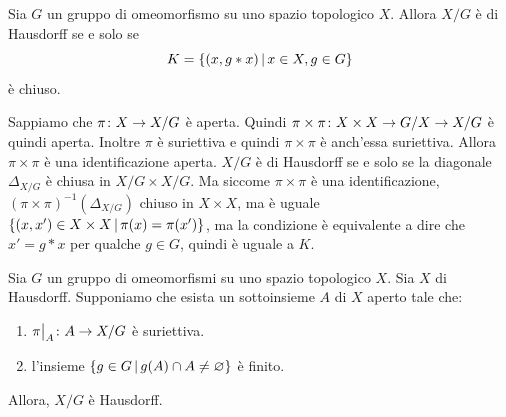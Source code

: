 \documentclass[a4paper]{article}
\begin{document}
\begin{snippetproposition}{}
    Sia \(G\) un gruppo di omeomorfismo su uno spazio topologico \(X\).
    Allora \(X/G\) è di Hausdorff se e solo se
    \[
        K = \{(x, g\ast x) \,|\, x\in X, g \in G\}
    \]
    è chiuso.
\end{snippetproposition}

\begin{snippetproof}{}
    Sappiamo che \(\pi \colon X \to X/G\) è aperta.
    Quindi \(\pi \times \pi \colon X \times X \to G/X \to X/G\)
    è quindi aperta. Inoltre \(\pi\) è suriettiva e quindi \(\pi \times \pi\) è anch'essa suriettiva.
    Allora \(\pi \times \pi\) è una identificazione aperta.
    \(X/G\) è di Hausdorff se e solo se la diagonale \(\Delta_{X/G}\) è chiusa in \(X/G \times X/G\).
    Ma siccome \(\pi \times \pi\) è una identificazione, 
    \((\pi \times \pi)^{-1}(\Delta_{X/G})\) chiuso in \(X \times X\),
    ma è uguale \(\{(x,x') \in X \times X \,|\, \pi(x) = \pi(x')\}\),
    ma la condizione è equivalente a dire che \(x' = g \ast x\) per qualche \(g \in G\),
    quindi è uguale a \(K\).
\end{snippetproof}

\begin{snippetproposition}{}
    Sia \(G\) un gruppo di omeomorfismi su uno spazio topologico \(X\).
    Sia \(X\) di Hausdorff. Supponiamo che esista un sottoinsieme \(A\)
    di \(X\) aperto tale che:
    \begin{enumerate}
        \item \(\restr{\pi}{A} \colon A \fromto X/G\) è suriettiva.
        \item l'insieme \(\{g\in G \,|\, g(A) \cap A \neq \varnothing\}\) è finito.
    \end{enumerate}
    Allora, \(X/G\) è Hausdorff.
\end{snippetproposition}
\end{document}
